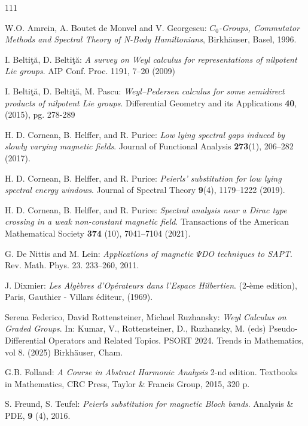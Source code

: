 \documentclass[12pt]{article}
\theoremstyle{definition}
\numberwithin{equation}{section}
\begin{document}
\begin{thebibliography}{111}

 W.O. Amrein, A. Boutet de Monvel and V. Georgescu:
{\it $C_0$-Groups, Commutator Methods and Spectral Theory of N-Body
	Hamiltonians}, Birkh\"auser, Basel, 1996.
	
 I. Belti\c{t}\u{a}, D. Belti\c{t}\u{a}: \textit{A survey on  Weyl calculus for representations of nilpotent Lie groups}. AIP Conf. Proc. 1191, 7–20 (2009)

 I. Belti\c{t}\u{a}, D. Belti\c{t}\u{a}, M. Pascu: \textit{Weyl–Pedersen calculus for some semidirect products of nilpotent Lie groups}. Differential Geometry and its Applications
\textbf{40}, (2015), pg. 278-289

 H. D. Cornean, B. Helffer, and R. Purice: \textit{Low lying spectral gaps induced by slowly varying magnetic fields}. Journal of Functional Analysis {\bf 273}(1), 206--282 (2017).

 H. D. Cornean, B. Helffer, and R. Purice: \textit{Peierls' substitution for low lying spectral energy windows}. Journal of Spectral Theory {\bf 9}(4), 1179--1222 (2019).

 H. D. Cornean, B. Helffer, and R. Purice: \textit{Spectral analysis near a Dirac type crossing in a weak non-constant magnetic field}. Transactions of the American Mathematical Society \textbf{374} (10),  7041--7104 (2021).

 G. De Nittis and M. Lein: \textit{Applications of magnetic $\Psi$DO techniques to SAPT}.
Rev. Math. Phys. 23. 233--260, 2011.

 J. Dixmier: {\it Les Alg\`{e}bres d'Op\'{e}rateurs dans l'Espace Hilbertien}.  (2-\`{e}me edition), Paris, Gauthier - Villars \'{e}diteur, (1969).

Serena Federico, David Rottensteiner, Michael Ruzhansky: \textit{Weyl Calculus on Graded Groups}. In: Kumar, V., Rottensteiner, D., Ruzhansky, M. (eds) Pseudo-Differential Operators and Related Topics. PSORT 2024. Trends in Mathematics, vol 8. (2025) Birkhäuser, Cham.

 G.B. Folland: \textit{A Course in Abstract Harmonic Analysis} 2-nd edition. Textbooks in Mathematics, CRC Press, Taylor \& Francis Group, 2015, 320 p.

 S. Freund, S. Teufel: \textit{Peierls substitution for magnetic Bloch bands}. Analysis \& PDE, \textbf{9}
(4), 2016.


\end{thebibliography}
\end{document}
